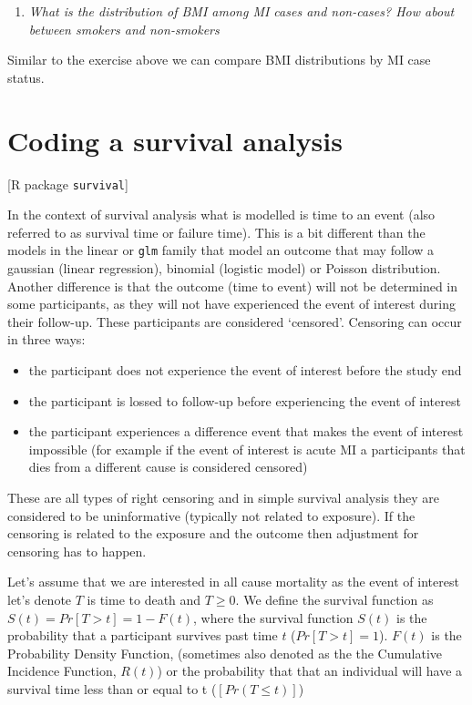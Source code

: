 \documentclass[
]{book}
\providecommand{\tightlist}{%
  \setlength{\itemsep}{0pt}\setlength{\parskip}{0pt}}
\begin{document}
\begin{enumerate}
\def\labelenumi{\arabic{enumi}.}
\setcounter{enumi}{4}
\tightlist
\item
  \emph{What is the distribution of BMI among MI cases and non-cases? How about between smokers and non-smokers}
\end{enumerate}

Similar to the exercise above we can compare BMI distributions by MI case status.

\hypertarget{coding-a-survival-analysis}{%
\section{Coding a survival analysis}\label{coding-a-survival-analysis}}

{[}R package \texttt{survival}{]}

In the context of survival analysis what is modelled is time to an event (also referred to as survival time or failure time). This is a bit different than the models in the linear or \texttt{glm} family that model an outcome that may follow a gaussian (linear regression), binomial (logistic model) or Poisson distribution. Another difference is that the outcome (time to event) will not be determined in some participants, as they will not have experienced the event of interest during their follow-up. These participants are considered `censored'. Censoring can occur in three ways:

\begin{itemize}
\item the participant does not experience the event of interest before the study end
\item the participant is lossed to follow-up before experiencing the event of interest
\item the participant experiences a difference event that makes the event of interest impossible (for example if the event of interest is acute MI a participants that dies from a different cause is considered censored)
\end{itemize}

These are all types of right censoring and in simple survival analysis they are considered to be uninformative (typically not related to exposure). If the censoring is related to the exposure and the outcome then adjustment for censoring has to happen.

Let's assume that we are interested in all cause mortality as the event of interest let's denote \(T\) is time to death and \(T\geq 0\). We define the survival function as
\(S(t)=Pr[T>t]=1-F(t)\), where the survival function \(S(t)\) is the probability that a participant survives past time \(t\) (\(Pr[T>t]=1\)). \(F(t)\) is the Probability Density Function, (sometimes also denoted as the the Cumulative Incidence Function, \(R(t)\)) or the probability that that an individual will have a survival time less than or equal to t (\([Pr(T≤t)]\))
\end{document}
